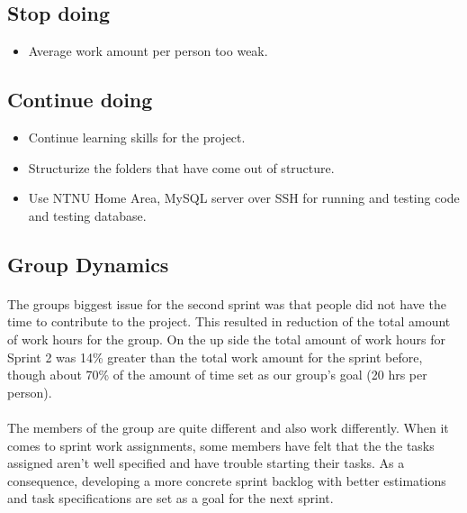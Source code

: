 \subsection{Stop doing}
\begin{itemize}
\item Average work amount per person too weak.  \\
\end{itemize}

\subsection{Continue doing}
\begin{itemize}
\item Continue learning skills for the project.
\item Structurize the folders that have come out of structure. 
\item Use NTNU Home Area, MySQL server over SSH for running and testing code and testing database. \\
\end{itemize}

\subsection{Group Dynamics}

\paragraph{} The groups biggest issue for the second sprint was that people did not have the time to contribute to the project. This resulted in reduction of the total amount of work hours for the group. On the up side the total amount of work hours for Sprint 2 was 14\% greater than the total work amount for the sprint before, though about 70\% of the amount of time set as our group’s goal (20 hrs per person). 

\paragraph{} The members of the group are quite different and also work differently. When it comes to sprint work assignments, some members have felt that the the tasks assigned aren’t well specified and have trouble starting their tasks. As a consequence, developing a more concrete sprint backlog with better estimations and task specifications are set as a goal for the next sprint. 

